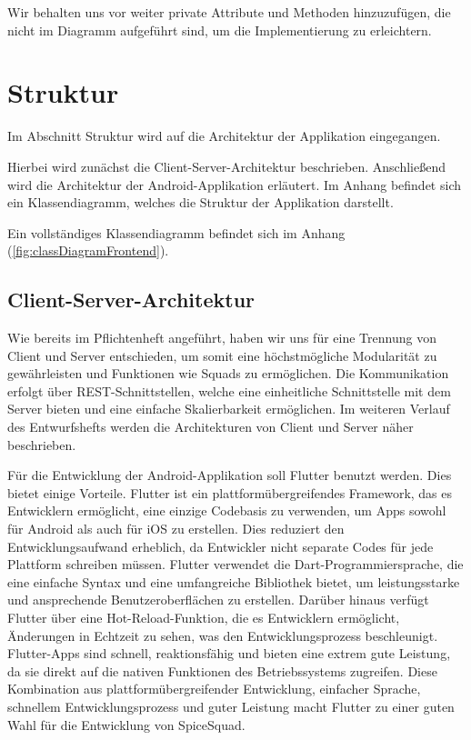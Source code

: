\documentclass{entwurfsheft}
\begin{document}
\begin{sloppypar}
Wir behalten uns vor weiter private Attribute und Methoden hinzuzufügen, die nicht im Diagramm aufgeführt sind, um die Implementierung zu erleichtern.
\newpage
\section{Struktur}
Im Abschnitt Struktur wird auf die Architektur der Applikation eingegangen.

Hierbei wird zunächst die Client-Server-Architektur beschrieben.
Anschließend wird die Architektur der Android-Applikation erläutert.
Im Anhang befindet sich ein Klassendiagramm, welches die Struktur der Applikation darstellt. 

Ein vollständiges Klassendiagramm befindet sich im Anhang (\autoref{fig:classDiagramFrontend}).

\subsection{Client-Server-Architektur}
Wie bereits im Pflichtenheft angeführt, haben wir uns für eine Trennung von Client und Server entschieden, um somit eine höchstmögliche Modularität zu gewährleisten und
Funktionen wie Squads zu ermöglichen. Die Kommunikation erfolgt über REST-Schnittstellen, welche eine einheitliche Schnittstelle mit dem Server bieten und eine einfache Skalierbarkeit ermöglichen.
Im weiteren Verlauf des Entwurfshefts werden die Architekturen von Client und Server näher beschrieben.

Für die Entwicklung der Android-Applikation soll Flutter benutzt werden. Dies bietet einige Vorteile. Flutter ist ein plattformübergreifendes Framework, das es Entwicklern ermöglicht, eine einzige Codebasis zu verwenden, um Apps sowohl für Android als auch für iOS zu erstellen. Dies reduziert den Entwicklungsaufwand erheblich, da Entwickler nicht separate Codes für jede Plattform schreiben müssen. Flutter verwendet die Dart-Programmiersprache, die eine einfache Syntax und eine umfangreiche Bibliothek bietet, um leistungsstarke und ansprechende Benutzeroberflächen zu erstellen. Darüber hinaus verfügt Flutter über eine Hot-Reload-Funktion, die es Entwicklern ermöglicht, Änderungen in Echtzeit zu sehen, was den Entwicklungsprozess beschleunigt. Flutter-Apps sind schnell, reaktionsfähig und bieten eine extrem gute Leistung, da sie direkt auf die nativen Funktionen des Betriebssystems zugreifen. Diese Kombination aus plattformübergreifender Entwicklung, einfacher Sprache, schnellem Entwicklungsprozess und guter Leistung macht Flutter zu einer guten Wahl für die Entwicklung von SpiceSquad.

\end{sloppypar}
\end{document}

